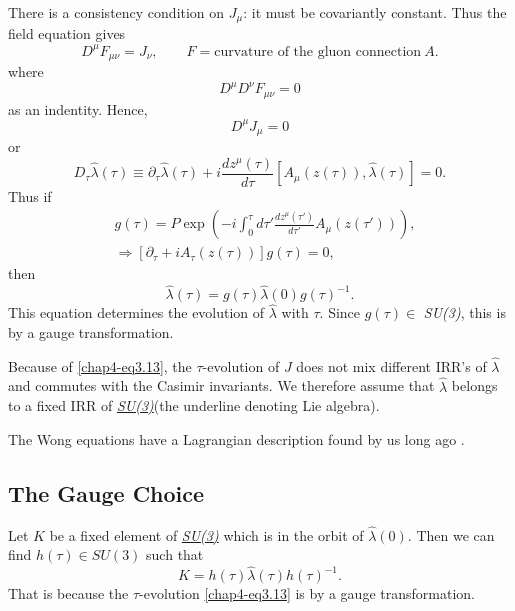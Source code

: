 There is a consistency condition on $J_\mu$: it must be covariantly constant. Thus the field equation gives
\begin{equation}
D^\mu F_{\mu \nu} = J_\nu, \qquad F= \text{curvature of the gluon connection}~ A. \label{chap4-eq3.7}
\end{equation}
where
\begin{equation}
D^\mu D^\nu F_{\mu \nu}=0 \label{chap4-eq3.8}
\end{equation}
as an indentity. Hence,
\begin{equation}
D^\mu J_\mu =0 \label{chap4-eq3.9}
\end{equation}
or
\begin{equation}
D_\tau \hat{\lambda} (\tau) \equiv \partial_\tau \hat{\lambda} (\tau) + i \frac{dz^\mu(\tau)}{d \tau} \left[A_\mu (z(\tau)), \hat{\lambda}(\tau)\right] =0. \label{chap4-eq3.10}
\end{equation}
Thus if
\begin{align}
  & g(\tau) = P \exp \left(-i \int^\tau_0 d \tau' \frac{dz^\mu(\tau')}{d \tau'} A_\mu (z(\tau')) \right), \label{chap4-eq3.11}\\
  & \Longrightarrow [\partial_\tau +i A_\tau (z(\tau))] g (\tau)=0, \label{chap4-eq3.12}
\end{align}
then
\begin{equation}
\hat{\lambda} (\tau) = g (\tau) \hat{\lambda} (0) g (\tau)^{-1}. \label{chap4-eq3.13}
\end{equation}
This equation determines the evolution of $\hat{\lambda}$ with $\tau$. Since $g(\tau) \in$ \textit{SU(3)}, this is by a gauge transformation.

Because of \eqref{chap4-eq3.13}, the $\tau$-evolution of $J$ does not mix different IRR's of $\hat{\lambda}$ and commutes with the Casimir invariants. We therefore assume that $\hat{\lambda}$ belongs to a fixed IRR of \ul{\textit{SU(3)}}(the underline denoting Lie algebra).

The Wong equations have a Lagrangian description found by us long ago \cite{chap4-key12}.

\subsection{The Gauge Choice}\label{chap4-sec3.1}

Let $K$ be a fixed element of \ul{\textit{SU(3)}} which is in the orbit of $\hat{\lambda}(0)$. Then we can find $h (\tau) \in SU(3)$ such that
\begin{equation}
  K= h (\tau) \hat{\lambda} (\tau) h(\tau)^{-1}.\label{chap4-eq3.14}
\end{equation}
That is because the $\tau$-evolution \eqref{chap4-eq3.13} is by a gauge transformation.

